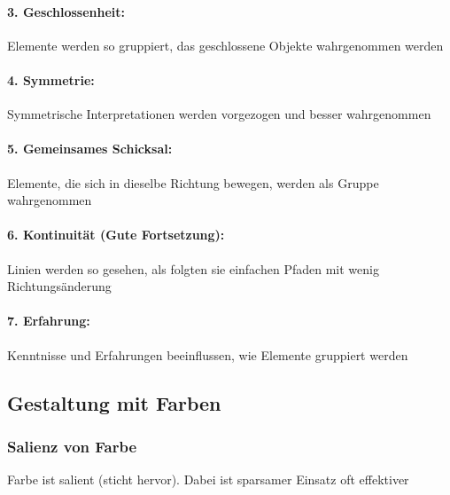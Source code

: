 			\paragraph{3. Geschlossenheit:} Elemente werden so gruppiert, das geschlossene Objekte wahrgenommen
			werden
			
			\paragraph{4. Symmetrie:} Symmetrische Interpretationen werden vorgezogen und besser wahrgenommen
				
			\paragraph{5. Gemeinsames Schicksal:} Elemente, die sich in dieselbe Richtung bewegen, werden als Gruppe wahrgenommen
				
		\pagebreak
		
			\paragraph{6. Kontinuität (Gute Fortsetzung):} Linien werden so gesehen, als folgten sie einfachen Pfaden mit wenig Richtungsänderung
				
			\paragraph{7. Erfahrung:} Kenntnisse und Erfahrungen beeinflussen, wie Elemente gruppiert werden
	
		\pagebreak
	
	\subsection{Gestaltung mit Farben}
		\subsubsection{Salienz von Farbe}
			Farbe ist salient (sticht hervor). Dabei ist sparsamer Einsatz oft effektiver
			
